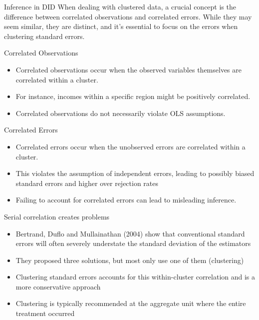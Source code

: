 \documentclass{beamer}
\begin{document}
\begin{frame}{Inference in DID}
  When dealing with clustered data, a crucial concept is the difference between correlated observations and correlated errors. While they may seem similar, they are distinct, and it's essential to focus on the errors when clustering standard errors.
\end{frame}

\begin{frame}{Correlated Observations}
  \begin{itemize}
    \item Correlated observations occur when the observed variables themselves are correlated within a cluster.
    \item For instance, incomes within a specific region might be positively correlated.
    \item Correlated observations do not necessarily violate OLS assumptions.
  \end{itemize}
\end{frame}

\begin{frame}{Correlated Errors}
  \begin{itemize}
    \item Correlated errors occur when the unobserved errors are correlated within a cluster.
    \item This violates the assumption of independent errors, leading to possibly biased standard errors and higher over rejection rates
    \item Failing to account for correlated errors can lead to misleading inference.
  \end{itemize}
\end{frame}


\begin{frame}{Serial correlation creates problems}
  \begin{itemize}
	\item  Bertrand, Duflo and Mullainathan (2004) show that conventional standard errors will often severely understate the standard deviation of the estimators
	\item They proposed three solutions, but most only use one of them (clustering)
	    \item Clustering standard errors accounts for this within-cluster correlation and is a more conservative approach 
	    \item Clustering is typically recommended at the aggregate unit where the entire treatment occurred

  \end{itemize}
\end{frame}
\end{document}
